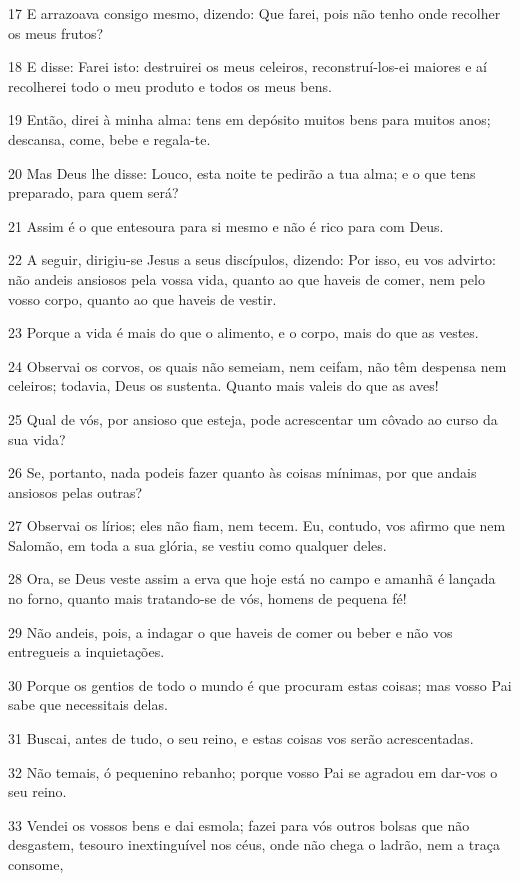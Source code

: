 \par 17 E arrazoava consigo mesmo, dizendo: Que farei, pois não tenho onde recolher os meus frutos?
\par 18 E disse: Farei isto: destruirei os meus celeiros, reconstruí-los-ei maiores e aí recolherei todo o meu produto e todos os meus bens.
\par 19 Então, direi à minha alma: tens em depósito muitos bens para muitos anos; descansa, come, bebe e regala-te.
\par 20 Mas Deus lhe disse: Louco, esta noite te pedirão a tua alma; e o que tens preparado, para quem será?
\par 21 Assim é o que entesoura para si mesmo e não é rico para com Deus.
\par 22 A seguir, dirigiu-se Jesus a seus discípulos, dizendo: Por isso, eu vos advirto: não andeis ansiosos pela vossa vida, quanto ao que haveis de comer, nem pelo vosso corpo, quanto ao que haveis de vestir.
\par 23 Porque a vida é mais do que o alimento, e o corpo, mais do que as vestes.
\par 24 Observai os corvos, os quais não semeiam, nem ceifam, não têm despensa nem celeiros; todavia, Deus os sustenta. Quanto mais valeis do que as aves!
\par 25 Qual de vós, por ansioso que esteja, pode acrescentar um côvado ao curso da sua vida?
\par 26 Se, portanto, nada podeis fazer quanto às coisas mínimas, por que andais ansiosos pelas outras?
\par 27 Observai os lírios; eles não fiam, nem tecem. Eu, contudo, vos afirmo que nem Salomão, em toda a sua glória, se vestiu como qualquer deles.
\par 28 Ora, se Deus veste assim a erva que hoje está no campo e amanhã é lançada no forno, quanto mais tratando-se de vós, homens de pequena fé!
\par 29 Não andeis, pois, a indagar o que haveis de comer ou beber e não vos entregueis a inquietações.
\par 30 Porque os gentios de todo o mundo é que procuram estas coisas; mas vosso Pai sabe que necessitais delas.
\par 31 Buscai, antes de tudo, o seu reino, e estas coisas vos serão acrescentadas.
\par 32 Não temais, ó pequenino rebanho; porque vosso Pai se agradou em dar-vos o seu reino.
\par 33 Vendei os vossos bens e dai esmola; fazei para vós outros bolsas que não desgastem, tesouro inextinguível nos céus, onde não chega o ladrão, nem a traça consome,
